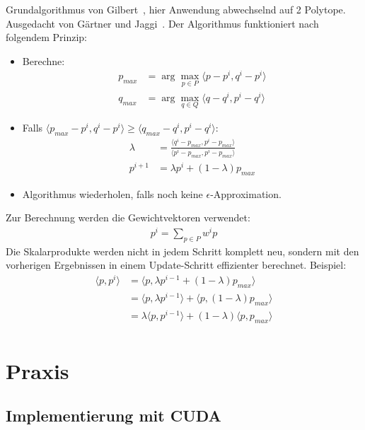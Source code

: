 \documentclass{scrartcl}
\begin{document}
Grundalgorithmus von Gilbert~\cite{eggilbert}, hier Anwendung abwechselnd auf 2 Polytope. Ausgedacht von Gärtner und Jaggi~\cite{jaggi}.
Der Algorithmus funktioniert nach folgendem Prinzip:
\begin{itemize}
\item Berechne:
\begin{align}
p_{max} &=\arg\max_{p \in P} \langle p - p^i, q^i - p^i \rangle \\
q_{max} &=\arg\max_{q \in Q} \langle q - q^i, p^i - q^i \rangle
\end{align}
\item Falls $ \langle p_{max} - p^i, q^i - p^i \rangle \geq \langle q_{max} - q^i, p^i - q^i \rangle$:
\begin{align}
\lambda&= \frac{\langle q^i-p_{max},p^i-p_{max}\rangle}{\langle p^i-p_{max},p^i-p_{max}\rangle}\\  
p^{i+1} &= \lambda p^i + (1 - \lambda) p_{max}
\end{align}
\item Algorithmus wiederholen, falls noch keine $\epsilon$-Approximation.
\end{itemize}
Zur Berechnung werden die Gewichtvektoren verwendet:
\begin{align}
p^i = \sum_{p \in P} w^i p
\end{align}
Die Skalarprodukte werden nicht in jedem Schritt komplett neu, sondern mit den vorherigen Ergebnissen in einem Update-Schritt effizienter berechnet.
Beispiel:
\begin{align}
\langle p , p^i \rangle &= \langle p , \lambda p^{i-1} + (1-\lambda) p_{max} \rangle \\
&= \langle p, \lambda p^{i-1} \rangle + \langle p, (1-\lambda) p_{max} \rangle \\
&= \lambda \langle p, p^{i-1} \rangle + (1-\lambda) \langle p, p_{max} \rangle \\
\end{align}

\section{Praxis}
\subsection{Implementierung mit CUDA}
\end{document}

